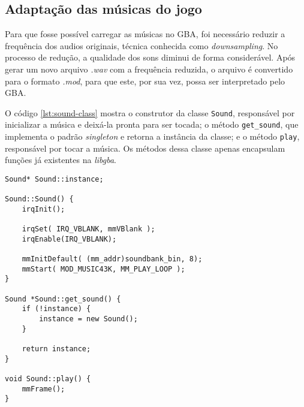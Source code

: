 \subsection{Adaptação das músicas do jogo}

Para que fosse possível carregar as músicas no GBA, foi necessário reduzir a frequência dos audios originais, técnica conhecida como \textit{downsampling}. No processo de redução, a qualidade dos sons diminui de forma considerável. Após gerar um novo arquivo \textit{.wav} com a frequência reduzida, o arquivo é convertido para o formato \textit{.mod}, para que este, por sua vez, possa ser interpretado pelo GBA.
 
O código \ref{lst:sound-class} mostra o construtor da classe \texttt{Sound}, responsável por inicializar a música e deixá-la pronta para ser tocada; o método \texttt{get\_sound}, que implementa o padrão \textit{singleton} e retorna a instância da classe; e o método \texttt{play}, responsável por tocar a música. Os métodos dessa classe apenas encapsulam funções já existentes na \textit{libgba}. 

\begin{lstlisting}[caption={Classe \texttt{Sound}},label={lst:sound-class}]
Sound* Sound::instance;

Sound::Sound() {
    irqInit();

    irqSet( IRQ_VBLANK, mmVBlank );
    irqEnable(IRQ_VBLANK);

    mmInitDefault( (mm_addr)soundbank_bin, 8); 
    mmStart( MOD_MUSIC43K, MM_PLAY_LOOP );
}

Sound *Sound::get_sound() {
    if (!instance) {
        instance = new Sound();
    }   

    return instance;
}

void Sound::play() {
    mmFrame();
}
\end{lstlisting}

